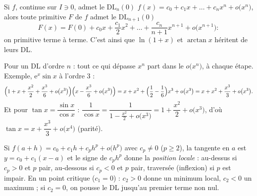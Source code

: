 \begin{theoreme}
Si $f$, continue sur $I\ni0$, admet le $\mathrm{DL}_{n}(0)$
$f(x)=c_0+c_1x+\dots+c_nx^{n}+o\bigl(x^{n}\bigr)$, alors toute primitive $F$ de $f$
admet le $\mathrm{DL}_{n+1}(0)$
\[
F(x)=F(0)+c_0x+\frac{c_1}{2}x^{2}+\dots+\frac{c_n}{n+1}x^{n+1}+o\bigl(x^{n+1}\bigr) :
\]
on primitive terme à terme. C'est ainsi que $\ln(1+x)$ et $\arctan x$
héritent de leurs DL.
\end{theoreme}

\begin{savoirfaire}
Pour un DL d'ordre $n$ : tout ce qui dépasse $x^{n}$ part dans le $o\bigl(x^{n}\bigr)$,
à chaque étape. Exemple, $\mathrm{e}^{x}\sin x$ à l'ordre $3$ :
\[
\Bigl(1+x+\frac{x^{2}}{2}+\frac{x^{3}}{6}+o\bigl(x^{3}\bigr)\Bigr)
\Bigl(x-\frac{x^{3}}{6}+o\bigl(x^{3}\bigr)\Bigr)
=x+x^{2}+\Bigl(\frac12-\frac16\Bigr)x^{3}+o\bigl(x^{3}\bigr)
=x+x^{2}+\frac{x^{3}}{3}+o\bigl(x^{3}\bigr).
\]
Et pour $\tan x=\dfrac{\sin x}{\cos x}$ :
$\dfrac{1}{\cos x}=\dfrac{1}{1-\frac{x^{2}}{2}+o\bigl(x^{3}\bigr)}
=1+\dfrac{x^{2}}{2}+o\bigl(x^{3}\bigr)$, d'où
$\tan x=x+\dfrac{x^{3}}{3}+o\bigl(x^{4}\bigr)$ (parité).
\end{savoirfaire}


\noindent
\begin{minipage}[c]{0.55\linewidth}
\begin{savoirfaire}
Si $f(a+h)=c_0+c_1h+c_ph^{p}+o\bigl(h^{p}\bigr)$ avec $c_p\neq0$ ($p\geqslant2$),
la tangente en $a$ est $y=c_0+c_1(x-a)$ et le signe de $c_p h^{p}$ donne la
\emph{position locale} : au-dessus si $c_p>0$ et $p$ pair, au-dessous si
$c_p<0$ et $p$ pair, traversée (inflexion) si $p$ est impair. En un point
critique ($c_1=0$) : $c_2>0$ donne un minimum local, $c_2<0$ un maximum ;
si $c_2=0$, on pousse le DL jusqu'au premier terme non nul.
\end{savoirfaire}
\end{minipage}\hfill
\begin{minipage}[c]{0.41\linewidth}
\centering
{}\\[0.5mm]
\end{minipage}

